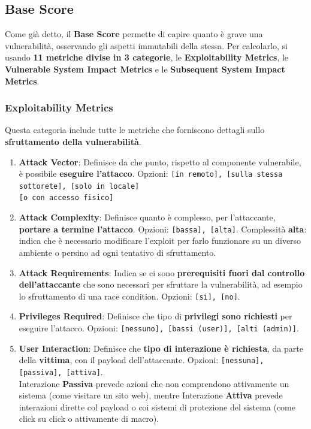 \documentclass{article}
\begin{document}
\subsection{Base Score}
Come già detto, il \textbf{Base Score} permette di capire quanto è grave una vulnerabilità, osservando gli aspetti immutabili della stessa. Per calcolarlo, si usando \textbf{11 metriche divise in 3 categorie}, le \textbf{Exploitability Metrics}, le \textbf{Vulnerable System Impact Metrics} e le \textbf{Subsequent System Impact Metrics}.

\subsubsection{Exploitability Metrics}
Questa categoria include tutte le metriche che forniscono dettagli sullo \textbf{sfruttamento della vulnerabilità}.
\begin{enumerate}
	\item \textbf{Attack Vector}: Definisce da che punto, rispetto al componente vulnerabile, è possibile \textbf{eseguire l'attacco}. Opzioni: \verb|[in remoto], [sulla stessa sottorete], [solo in locale]|\\ \verb|[o con accesso fisico]|
	
	\item \textbf{Attack Complexity}: Definisce quanto è complesso, per l’attaccante, \textbf{portare a termine l’attacco}. Opzioni: \verb|[bassa], [alta]|. Complessità \textbf{alta}: indica che è necessario modificare l’exploit per farlo funzionare su un diverso ambiente o persino ad ogni tentativo di sfruttamento.
	
	\item \textbf{Attack Requirements}: Indica se ci sono \textbf{prerequisiti fuori dal controllo dell’attaccante} che sono necessari per sfruttare la vulnerabilità, ad esempio lo sfruttamento di una race condition. Opzioni: \verb|[si], [no]|.
	
	\newpage
	
	\item \textbf{Privileges Required}: Definisce che tipo di \textbf{privilegi sono richiesti} per eseguire l’attacco. Opzioni: \verb|[nessuno], [bassi (user)], [alti (admin)]|.
	
	\item \textbf{User Interaction}: Definisce che \textbf{tipo di interazione è richiesta}, da parte della \textbf{vittima}, con il payload dell’attaccante. Opzioni: \verb|[nessuna], [passiva], [attiva]|.\\ Interazione \textbf{Passiva} prevede azioni che non comprendono attivamente un sistema (come visitare un sito web), mentre
	Interazione \textbf{Attiva} prevede interazioni dirette col payload o coi sistemi di protezione del sistema (come click su click o attivamente di macro).
\end{enumerate}
\end{document}

